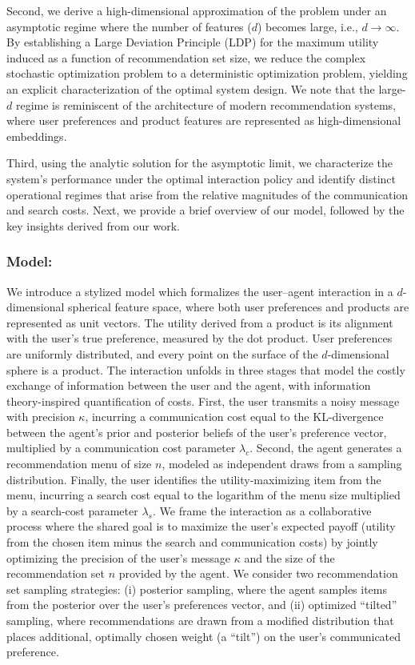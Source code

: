 \documentclass[12pt]{article}
\theoremstyle{definition}
\theoremstyle{remark}
\begin{document}
Second, we derive a high-dimensional approximation of the problem under an asymptotic regime where the number of features ($d$) becomes large, i.e., $d\rightarrow \infty$. By establishing a Large Deviation Principle (LDP) for the maximum utility induced as a function of recommendation set size, we reduce the complex stochastic optimization problem to a deterministic optimization problem, yielding an explicit characterization of the optimal system design. We note that the large-$d$ regime is reminiscent of the architecture of modern recommendation systems, where user preferences and product features are represented as high-dimensional embeddings.

Third, using the analytic solution for the asymptotic limit, we characterize the system's performance under the optimal interaction policy and identify distinct operational regimes that arise from the relative magnitudes of the communication and search costs. Next, we provide a brief overview of our model, followed by the key insights derived from our work.

\subsubsection{Model:} We introduce a stylized model which formalizes the user–agent interaction in a $d$-dimensional spherical feature space, where both user preferences and products are represented as unit vectors.
The utility derived from a product is its alignment with the user's true preference, measured by the dot product. User preferences are uniformly distributed, and every point on the surface of the $d$-dimensional sphere is a product. The interaction unfolds in three stages that model the costly exchange of information between the user and the agent, with information theory-inspired quantification of costs. First, the user transmits a noisy message with precision $\kappa$, incurring a communication cost equal to the KL-divergence between the agent’s prior and posterior beliefs of the user's preference vector, multiplied by a communication cost parameter $\lambda_c$. Second, the agent generates a recommendation menu of size $n$, modeled as independent draws from a sampling distribution. Finally, the user identifies the utility-maximizing item from the menu, incurring a search cost equal to the logarithm of the menu size multiplied by a search-cost parameter $\lambda_s$. We frame the interaction as a collaborative process where the shared goal is to maximize the user's expected payoff (utility from the chosen item minus the search and communication costs) by jointly optimizing the precision of the user's message $\kappa$ and the size of the recommendation set $n$ provided by the agent. We consider two recommendation set sampling strategies: (i) posterior sampling, where the agent samples items from the posterior over the user's preferences vector, and (ii) optimized ``tilted'' sampling, where recommendations are drawn from a modified distribution that places additional, optimally chosen weight (a “tilt”) on the user’s communicated preference.
\end{document}

